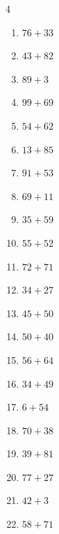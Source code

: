 \begin{multicols}{4}
\begin{enumerate}
  \item $76+33$
        \phantom{$=109$}

  \item $43+82$
        \phantom{$=125$}

  \item $89+3$
        \phantom{$=92$}

  \item $99+69$
        \phantom{$=168$}

  \item $54+62$
        \phantom{$=116$}

  \item $13+85$
        \phantom{$=98$}

  \item $91+53$
        \phantom{$=144$}

  \item $69+11$
        \phantom{$=80$}

  \item $35+59$
        \phantom{$=94$}

  \item $55+52$
        \phantom{$=107$}

  \item $72+71$
        \phantom{$=143$}

  \item $34+27$
        \phantom{$=61$}

  \item $45+50$
        \phantom{$=95$}

  \item $50+40$
        \phantom{$=90$}

  \item $56+64$
        \phantom{$=120$}

  \item $34+49$
        \phantom{$=83$}

  \item $6+54$
        \phantom{$=60$}

  \item $70+38$
        \phantom{$=108$}

  \item $39+81$
        \phantom{$=120$}

  \item $77+27$
        \phantom{$=104$}

  \item $42+3$
        \phantom{$=45$}

  \item $58+71$
        \phantom{$=129$}


\end{enumerate}
\end{multicols}
